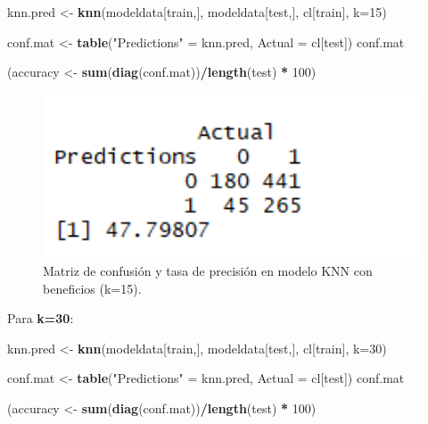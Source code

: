 \documentclass[spanish,]{article}
\newenvironment{Shaded}{\begin{snugshade}}{\end{snugshade}}
\newcommand{\KeywordTok}[1]{\textcolor[rgb]{0.13,0.29,0.53}{\textbf{#1}}}
\newcommand{\DataTypeTok}[1]{\textcolor[rgb]{0.13,0.29,0.53}{#1}}
\newcommand{\DecValTok}[1]{\textcolor[rgb]{0.00,0.00,0.81}{#1}}
\newcommand{\StringTok}[1]{\textcolor[rgb]{0.31,0.60,0.02}{#1}}
\newcommand{\OperatorTok}[1]{\textcolor[rgb]{0.81,0.36,0.00}{\textbf{#1}}}
\newcommand{\NormalTok}[1]{#1}
\begin{document}
\begin{Shaded}
\begin{Highlighting}[]
\NormalTok{knn.pred <-}\StringTok{ }\KeywordTok{knn}\NormalTok{(modeldata[train,], modeldata[test,], cl[train], }\DataTypeTok{k=}\DecValTok{15}\NormalTok{) }

\NormalTok{conf.mat <-}\StringTok{ }\KeywordTok{table}\NormalTok{(}\StringTok{"Predictions"}\NormalTok{ =}\StringTok{ }\NormalTok{knn.pred, }\DataTypeTok{Actual =}\NormalTok{ cl[test])}
\NormalTok{conf.mat}

\NormalTok{(accuracy <-}\StringTok{ }\KeywordTok{sum}\NormalTok{(}\KeywordTok{diag}\NormalTok{(conf.mat))}\OperatorTok{/}\KeywordTok{length}\NormalTok{(test) }\OperatorTok{*}\StringTok{ }\DecValTok{100}\NormalTok{)}
\end{Highlighting}
\end{Shaded}

\begin{figure}[h]
    \centering
    \includegraphics[width=1\textwidth]{figuras/KNN/benefits_k15.png}
    \caption{Matriz de confusión y tasa de precisión en modelo KNN con beneficios (k=15).}
    \label{fig:KNN:benefitsK15}
\end{figure}

Para \textbf{k=30}:

\begin{Shaded}
\begin{Highlighting}[]
\NormalTok{knn.pred <-}\StringTok{ }\KeywordTok{knn}\NormalTok{(modeldata[train,], modeldata[test,], cl[train], }\DataTypeTok{k=}\DecValTok{30}\NormalTok{) }

\NormalTok{conf.mat <-}\StringTok{ }\KeywordTok{table}\NormalTok{(}\StringTok{"Predictions"}\NormalTok{ =}\StringTok{ }\NormalTok{knn.pred, }\DataTypeTok{Actual =}\NormalTok{ cl[test])}
\NormalTok{conf.mat}

\NormalTok{(accuracy <-}\StringTok{ }\KeywordTok{sum}\NormalTok{(}\KeywordTok{diag}\NormalTok{(conf.mat))}\OperatorTok{/}\KeywordTok{length}\NormalTok{(test) }\OperatorTok{*}\StringTok{ }\DecValTok{100}\NormalTok{)}
\end{Highlighting}
\end{Shaded}
\end{document}
